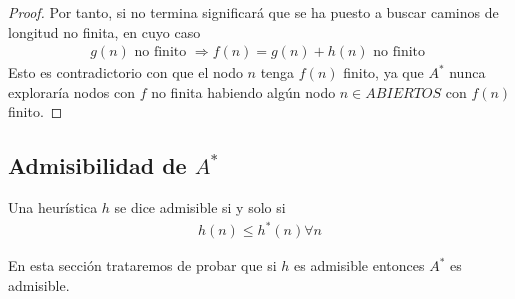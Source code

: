 \begin{itemize}
\begin{teo}[Completitud de $A^*$]
\begin{proof}
            Por tanto, si no termina significará que se ha puesto a buscar caminos de longitud no finita, en cuyo caso
            \begin{gather*}
                g(n) \text{ no finito } \Rightarrow f(n) = g(n) + h(n) \text{ no finito }
            \end{gather*}
            Esto es contradictorio con que el nodo $n$ tenga $f(n)$ finito, ya que $A^*$ nunca exploraría nodos con $f$ no finita habiendo algún nodo $n \in ABIERTOS$ con $f(n)$ finito.
        \end{proof}
    \end{teo}
\end{itemize}

\subsection{Admisibilidad de $A^*$}
\begin{definicion}
    Una heurística $h$ se dice admisible si y solo si 
    \begin{gather*}
        h(n) \leq h^*(n) \forall n
    \end{gather*}
\end{definicion}

En esta sección trataremos de probar que si $h$ es admisible entonces $A^*$ es admisible.

